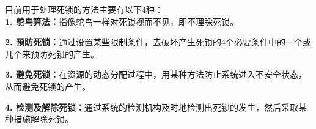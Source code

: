 目前用于处理死锁的方法主要有以下4种：\\

\textbf{1. 鸵鸟算法：}指像鸵鸟一样对死锁视而不见，即不理睬死锁。

\textbf{2.
预防死锁：}通过设置某些限制条件，去破坏产生死锁的4个必要条件中的一个或几个来预防死锁的产生。

\textbf{3.
避免死锁：}在资源的动态分配过程中，用某种方法防止系统进入不安全状态，从而避免死锁的产生。

\textbf{4.
检测及解除死锁：}通过系统的检测机构及时地检测出死锁的发生，然后采取某种措施解除死锁。
